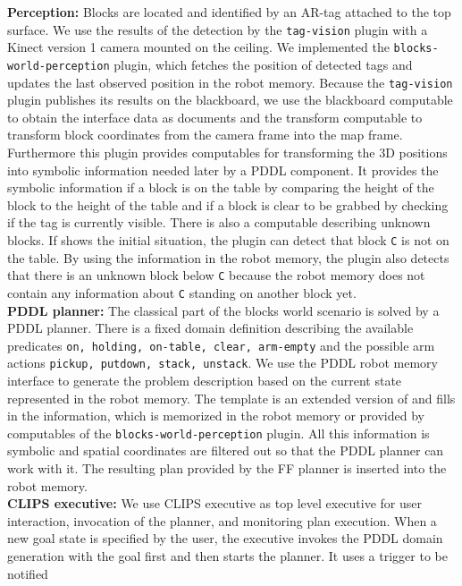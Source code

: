 \textbf{Perception:} Blocks are located and identified by an AR-tag
attached to the top surface. We use the results of the detection by
the \texttt{tag-vision} plugin with a Kinect version 1 camera mounted
on the ceiling. We implemented the \texttt{blocks-world-perception}
plugin, which fetches the position of detected tags and updates the
last observed position in the robot memory. Because the
\texttt{tag-vision} plugin publishes its results on the blackboard, we
use the blackboard computable to obtain the interface data as
documents and the transform computable to transform block coordinates
from the camera frame into the map frame. Furthermore this plugin
provides computables for transforming the 3D positions into symbolic
information needed later by a PDDL component. It provides the symbolic
information if a block is on the table by comparing the height of the
block to the height of the table and if a block is clear to be grabbed
by checking if the tag is currently visible. There is also a
computable describing unknown blocks. If 
shows the initial situation, the plugin can detect that block
\texttt{C} is not on the table. By using the information in the robot
memory, the plugin also detects that there is an unknown block below
\texttt{C} because the robot memory does not contain any information
about \texttt{C} standing on another block yet.
\\
\textbf{PDDL planner:} The classical part of the blocks world scenario
is solved by a PDDL planner. There is a fixed domain definition
describing the available predicates \texttt{on, holding, on-table,
  clear, arm-empty} and the possible arm actions \texttt{pickup,
  putdown, stack, unstack}. We use the PDDL robot memory interface to
generate the problem description based on the current state
represented in the robot memory. The template is an extended version
of  and fills in the information, which is
memorized in the robot memory or provided by computables of the
\texttt{blocks-world-perception} plugin. All this information is
symbolic and spatial coordinates are filtered out so that the PDDL
planner can work with it. The resulting plan provided by the FF
planner is inserted into the robot memory.
\\
\textbf{CLIPS executive:} We use CLIPS executive as top level
executive for user interaction, invocation of the planner, and
monitoring plan execution. When a new goal state is specified by the
user, the executive invokes the PDDL domain generation with the goal
first and then starts the planner. It uses a trigger to be notified
